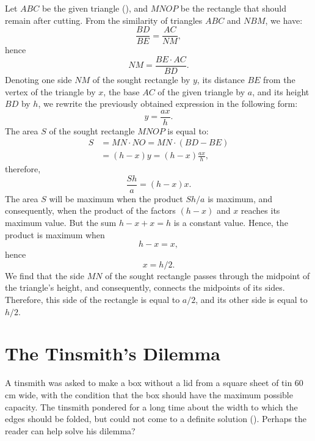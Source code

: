 \ans Let $ABC$ be the given triangle (), and $MNOP$ be the rectangle that should remain after cutting. From the similarity of triangles $ABC$ and $NBM$, we have:
\begin{equation*}%
\frac{BD}{BE} = \frac{AC}{NM},
\end{equation*}
hence
\begin{equation*}%
NM =  \frac{BE \cdot AC}{BD}.
\end{equation*}
Denoting one side $NM$ of the sought rectangle by $y$, its distance $BE$ from the vertex of the triangle by $x$, the base $AC$ of the given triangle by $a$, and its height $BD$ by $h$, we rewrite the previously obtained expression in the following form:
\begin{equation*}%
y = \frac{ax}{h}.
\end{equation*}
The area $S$ of the sought rectangle $MNOP$ is equal to:
\begin{align*}%
S &= MN \cdot NO = MN \cdot (BD - BE) \\
& = (h - x)y = (h - x)\frac{ax}{h},
\end{align*}
therefore,
\begin{equation*}%
\frac{Sh}{a} = (h - x)x.
\end{equation*}
The area $S$ will be maximum when the product $Sh / a $ is maximum, and consequently, when the product of the factors $(h - x)$ and $x$ reaches its maximum value. But the sum $h - x + x = h$ is a constant value. Hence, the product is maximum when
\begin{equation*}%
h - x = x,
\end{equation*}
hence
\begin{equation*}%
x = h/2.
\end{equation*}
We find that the side $MN$ of the sought rectangle passes through the midpoint of the triangle's height, and consequently, connects the midpoints of its sides. Therefore, this side of the rectangle is equal to $a/2$, and its other side is equal to $h/2$.


\section{The Tinsmith's Dilemma}
\label{sec-12.13}

\ques A tinsmith was asked to make a box without a lid from a square sheet of tin 60 cm wide, with the condition that the box should have the maximum possible capacity. The tinsmith pondered for a long time about the width to which the edges should be folded, but could not come to a definite solution (). Perhaps the reader can help solve his dilemma?

